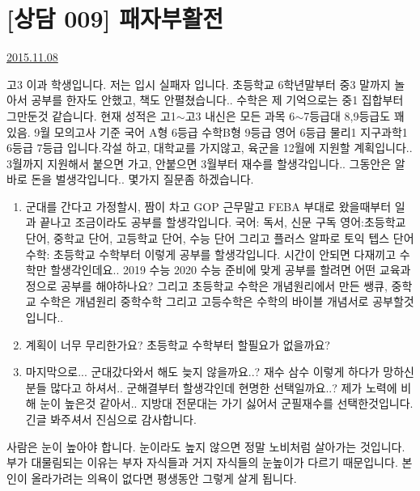 \section{[상담 009] 패자부활전}
\href{https://www.kockoc.com/Apoc/468945}{2015.11.08}


    \vspace{5mm}

    고3 이과 학생입니다. 저는 입시 실패자 입니다. 초등학교 6학년말부터 중3 말까지 놀아서 공부를 한자도 안했고, 책도 안펼쳤습니다.. 수학은 제 기억으로는 중1 집합부터 그만둔것 같습니다. 현재 성적은 고1$\sim$고3 내신은 모든 과목 6$\sim$7등급대 8,9등급도 꽤 있음. 9월 모의고사 기준 국어 A형 6등급 수학B형 9등급 영어 6등급 물리1 지구과학1 6등급 7등급 입니다.각설 하고, 대학교를 가지않고, 육군을 12월에 지원할 계획입니다.. 3월까지 지원해서 붙으면 가고, 안붙으면 3월부터 재수를 할생각입니다.. 그동안은 알바로 돈을 벌생각입니다.. 몇가지 질문좀 하겠습니다.
    \vspace{5mm}
    \begin{enumerate}
        \item 군대를 간다고 가정할시, 짬이 차고 GOP 근무말고 FEBA 부대로 왔을때부터 일과 끝나고 조금이라도 공부를 할생각입니다.
        국어: 독서, 신문 구독  영어:초등학교 단어, 중학교 단어, 고등학교 단어, 수능 단어 그리고 플러스 알파로 토익 텝스 단어
        수학: 초등학교 수학부터    이렇게 공부를 할생각입니다. 시간이 안되면 다재끼고 수학만 할생각인데요.. 2019 수능 2020 수능 준비에 맞게 공부를 할려면 어떤 교육과정으로 공부를 해야하나요? 그리고 초등학교 수학은 개념원리에서 만든 쌩큐, 중학교 수학은 개념원리 중학수학 그리고 고등수학은 수학의 바이블 개념서로 공부할것입니다..
        \vspace{5mm}
        
        \item 계획이 너무 무리한가요? 초등학교 수학부터 할필요가 없을까요?
        \vspace{5mm}
        
        \item 마지막으로... 군대갔다와서 해도 늦지 않을까요..? 재수 삼수 이렇게 하다가 망하신분들 많다고 하셔서.. 군해결부터 할생각인데 현명한 선택일까요..? 제가 노력에 비해 눈이 높은것 같아서.. 지방대 전문대는 가기 싫어서 군필재수를 선택한것입니다.
        긴글 봐주셔서 진심으로 감사합니다.
        
    \end{enumerate}
\vspace{5mm}

사람은 눈이 높아야 합니다. 눈이라도 높지 않으면 정말 노비처럼 살아가는 것입니다.
부가 대물림되는 이유는 부자 자식들과 거지 자식들의 눈높이가 다르기 때문입니다.
본인이 올라가려는 의욕이 없다면 평생동안 그렇게 살게 됩니다.
\vspace{5mm}

